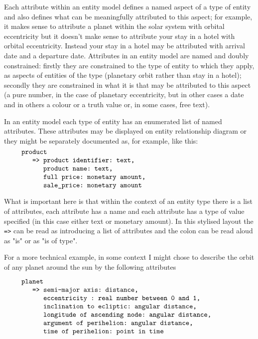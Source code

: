 \mynote 
Each attribute within an entity model defines a named aspect of a type of entity and
also defines what can be meaningfully attributed to this aspect; 
for example, it makes sense to  attribute a planet within the solar system with
 orbital eccentricity
 but it doesn't make sense to attribute your stay in a hotel with orbital eccentricity. 
 Instead your stay in a hotel may be attributed with arrival date and a departure date.
Attributes in an entity model are named and doubly constrained:
firstly they are constrained to the type of entity to which they apply, 
as aspects of entities of the type (planetary orbit rather than stay in a hotel);
secondly they are constrained in what it is that may be attributed to this aspect 
(a pure number, in the case of planetary eccentricity, 
but in other cases a date and in others a colour or a truth value or, in
some cases, free text).

\mynote
In an entity model each type of entity has an enumerated list of named attributes. These attributes may be displayed on entity relationship diagram or they might be separately documented as, for example,
 like this:
 \begin{equation}
\label{productAttributes}
\begin{minipage}{0.9\textwidth}
\begin{verbatim}
product 
   => product identifier: text,
      product name: text,
      full price: monetary amount,
      sale_price: monetary amount
\end{verbatim}
\end{minipage}
\end{equation}


What is important here is that within the context of an entity type there is a list of attributes, each attribute has a name and each attribute has a type of value specified (in this case either text or monetary amount). In this stylised layout the \verb!=>! can be read as introducing a list of attributes and the colon can be read aloud as "is" or as "is of type". 

For a more technical example, in some context I might chose to describe the orbit of any planet around the sun by the following attributes



\begin{equation}
\label{planetaryAttributes}
\begin{minipage}{0.9\textwidth}
\begin{verbatim}
planet 
   => semi-major axis: distance,
      eccentricity : real number between 0 and 1,
      inclination to ecliptic: angular distance,
      longitude of ascending node: angular distance,
      argument of perihelion: angular distance,
      time of perihelion: point in time
\end{verbatim}
\end{minipage}
\end{equation}


